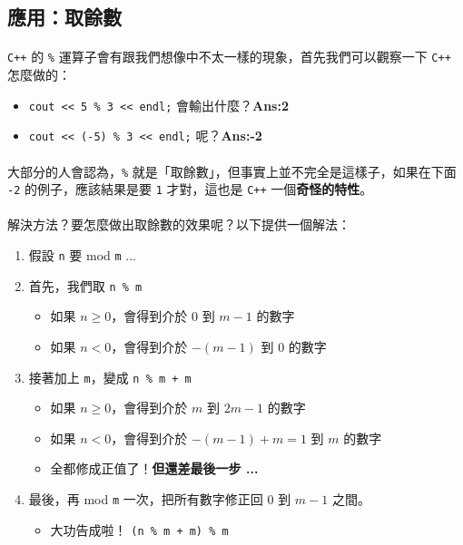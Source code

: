 \documentclass[12pt,a4paper,oneside]{report}
\begin{document}
\begin{CJK}{UTF8}{bkai}
\subsection{應用：取餘數}

\paragraph{}\texttt{C++} 的 \lstinline!%! 運算子會有跟我們想像中不太一樣的現象，首先我們可以觀察一下 \texttt{C++} 怎麼做的：
\begin{itemize}
\item \lstinline!cout << 5 % 3 << endl;! 會輸出什麼？{\textbf{Ans:2}}
\item \lstinline!cout << (-5) % 3 << endl;! 呢？{\textbf{Ans:-2}}
\end{itemize}

\paragraph{}大部分的人會認為，\lstinline!%! 就是「取餘數」，但事實上並不完全是這樣子，如果在下面 \lstinline!-2! 的例子，應該結果是要 \lstinline!1! 才對，這也是 \texttt{C++} 一個\textbf{奇怪的特性}。

\paragraph{}解決方法？要怎麼做出取餘數的效果呢？以下提供一個解法：
  
\begin{enumerate}
\item 假設 \lstinline!n! 要 mod \lstinline!m! ...
\item 首先，我們取 \lstinline!n % m!
  \begin{itemize}
  \item 如果 $n\geq{0}${，會得到介於 $0$ 到 $m-1$ 的數字}
  \item 如果 $n<0${，會得到介於 $-(m-1)$ 到 $0$ 的數字}
  \end{itemize}
\item 接著加上 \lstinline!m!，變成 \lstinline!n % m + m!
  \begin{itemize}
  \item 如果 $n\geq{0}${，會得到介於 $m$ 到 $2m-1$ 的數字}
  \item 如果 $n<0${，會得到介於 $-(m-1)+m=1$ 到 $m$ 的數字}
  \item 全都修成正值了！{\textbf{但還差最後一步 ...}}
  \end{itemize}
\item 最後，再 mod \lstinline!m! 一次，把所有數字修正回 $0$ 到 $m-1$ 之間。
  \begin{itemize}
  \item 大功告成啦！ \lstinline!(n % m + m) % m!
  \end{itemize}
\end{enumerate}


\end{CJK}
\end{document}

